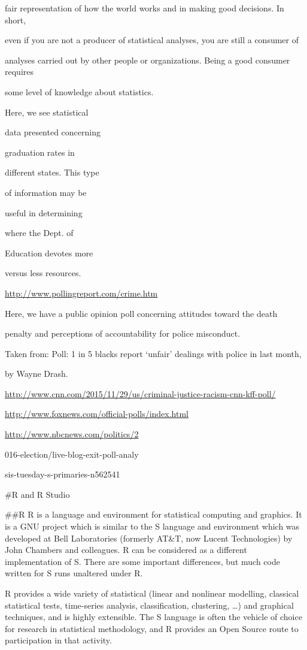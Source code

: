 \documentclass[
]{book}
\begin{document}
fair representation of how the world works and in making good decisions. In short,

even if you are not a producer of statistical analyses, you are still a consumer of

analyses carried out by other people or organizations. Being a good consumer requires

some level of knowledge about statistics.

Here, we see statistical

data presented concerning

graduation rates in

different states. This type

of information may be

useful in determining

where the Dept. of

Education devotes more

versus less resources.

\url{http://www.pollingreport.com/crime.htm}

Here, we have a public opinion poll concerning attitudes toward the death

penalty and perceptions of accountability for police misconduct.

Taken from: Poll: 1 in 5 blacks report `unfair' dealings with police in last month,

by Wayne Drash.

\url{http://www.cnn.com/2015/11/29/us/criminal-justice-racism-cnn-kff-poll/}

\url{http://www.foxnews.com/official-polls/index.html}

\url{http://www.nbcnews.com/politics/2}

016-election/live-blog-exit-poll-analy

sis-tuesday-s-primaries-n562541

\#R and R Studio

\#\#R
R is a language and environment for statistical computing and graphics. It is a GNU project which is similar to the S language and environment which was developed at Bell Laboratories (formerly AT\&T, now Lucent Technologies) by John Chambers and colleagues. R can be considered as a different implementation of S. There are some important differences, but much code written for S runs unaltered under R.

R provides a wide variety of statistical (linear and nonlinear modelling, classical statistical tests, time-series analysis, classification, clustering, \ldots) and graphical techniques, and is highly extensible. The S language is often the vehicle of choice for research in statistical methodology, and R provides an Open Source route to participation in that activity.
\end{document}
